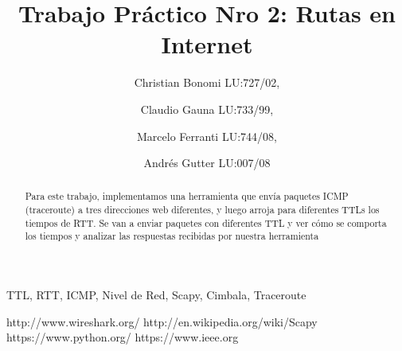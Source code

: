 \documentclass[%
        final,
        notitlepage,
        narroweqnarray,
        inline,
        ]{ieee}
\begin{document}
\title[Short Title]{Trabajo Práctico Nro 2: Rutas en Internet}

\author[SHORT NAMES]{%
      Christian Bonomi \small{LU:727/02},
    \and
      Claudio Gauna \small{LU:733/99},
    \and
      Marcelo Ferranti \small{LU:744/08},
    \and  
      Andrés Gutter \small{LU:007/08}
  }





\maketitle               

\begin{abstract}
Para este trabajo, implementamos una herramienta que envía paquetes ICMP (traceroute) a tres direcciones web diferentes, 
y luego arroja para diferentes TTLs los tiempos de RTT. Se van a enviar paquetes con diferentes TTL y ver cómo se comporta 
los tiempos y analizar las respuestas recibidas por nuestra herramienta
\end{abstract}

\begin{keywords}
TTL, RTT, ICMP, Nivel de Red, Scapy, Cimbala, Traceroute
\end{keywords}




% 
% 
%





\begin{thebibliography}{1}

http://www.wireshark.org/
http://en.wikipedia.org/wiki/Scapy
https://www.python.org/
https://www.ieee.org
\end{thebibliography}
\end{document}
